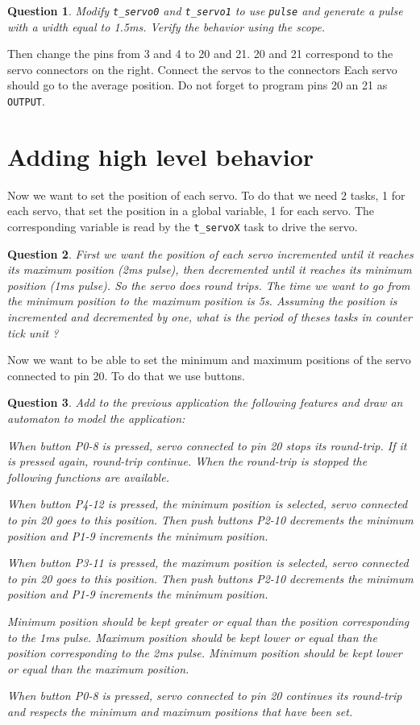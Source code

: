 \documentclass[11pt]{report}
\newtheorem{ex}{Question}
\begin{document}
\begin{ex}
Modify \texttt{t_servo0} and \texttt{t_servo1} to use \texttt{pulse} and generate a pulse with a width  equal to 1.5ms. Verify the behavior using the scope.
\end{ex}

Then change the pins from 3 and 4 to 20 and 21. 20 and 21 correspond to the servo connectors on the right. Connect the servos to the connectors Each servo should go to the average position. Do not forget to program pins 20 an 21 as \texttt{OUTPUT}.

\section{Adding high level behavior}

Now we want to set the position of each servo. To do that we need 2 tasks, 1 for each servo, that set the position in a global variable, 1 for each servo. The corresponding variable is read by the \texttt{t_servoX} task to drive the servo.

\begin{ex}
First we want the position of each servo incremented until it reaches its maximum position (2ms pulse), then decremented until it reaches its minimum position (1ms pulse). So the servo does round trips. The time we want to go from the minimum position to the maximum position is 5s. Assuming the position is incremented and decremented by one, what is the period of theses tasks in counter tick unit ?
\end{ex}

Now we want to be able to set the minimum and maximum positions of the servo connected to pin 20. To do that we use buttons.

\begin{ex}
Add to the previous application the following features and draw an automaton to model the application:

When button P0-8 is pressed, servo connected to pin 20 stops its round-trip. If it is pressed again, round-trip continue. When the round-trip is stopped the following functions are available.

When button P4-12 is pressed, the minimum position is selected, servo connected to pin 20 goes to this position. Then push buttons P2-10 decrements the minimum position and P1-9 increments the minimum position.

When button P3-11 is pressed, the maximum position is selected, servo connected to pin 20 goes to this position. Then push buttons P2-10 decrements the minimum position and P1-9 increments the minimum position.

Minimum position should be kept greater or equal than the position corresponding to the 1ms pulse. Maximum position should be kept lower or equal than the position corresponding to the 2ms pulse. Minimum position should be kept lower or equal than the maximum position.

When button P0-8 is pressed, servo connected to pin 20 continues its round-trip and respects the minimum and maximum positions that have been set.
\end{ex}
\end{document}
